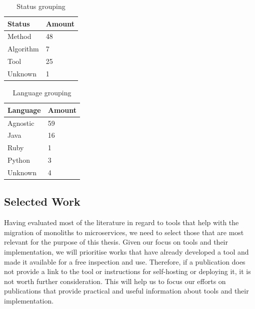 \documentclass[conference]{IEEEtran}
\begin{document}
\begin{table}[!htb] \caption{Status grouping} \label{tab:status-grouping}
  \begin{center}
    \begin{tabular}[c]{p{12em}|p{4em}}
      \textbf{Status} &
      \textbf{Amount} \\
      \hline Method & {48} \\
      \hline Algorithm & {7} \\
      \hline Tool & {25} \\
      \hline Unknown & {1} \\
    \end{tabular}
  \end{center}
\end{table}

\begin{table}[!htb] \caption{Language grouping} \label{tab:language-grouping}
  \begin{center}
    \begin{tabular}[c]{p{12em}|p{4em}}
      \textbf{Language} &
      \textbf{Amount} \\
      \hline Agnostic & {59} \\
      \hline Java & {16} \\
      \hline Ruby & {1} \\
      \hline Python & {3} \\
      \hline Unknown & {4} \\
    \end{tabular}
  \end{center}
\end{table}

\subsection{Selected Work}

Having evaluated most of the literature in regard to tools that help with the
migration of monoliths to microservices, we need to select those that are most
relevant for the purpose of this thesis. Given our focus on tools and their
implementation, we will prioritise works that have already developed a tool and
made it available for a free inspection and use. Therefore, if a publication
does not provide a link to the tool or instructions for self-hosting or
deploying it, it is not worth further consideration. This will help us to focus
our efforts on publications that provide practical and useful information about
tools and their implementation.
\end{document}
